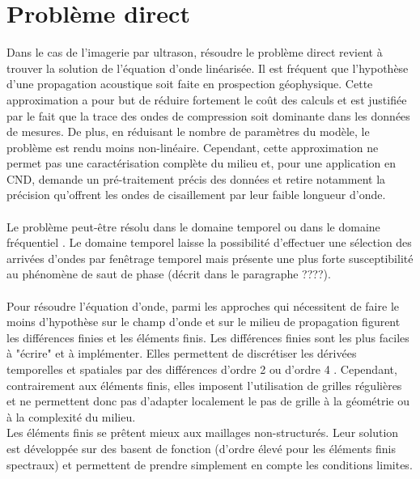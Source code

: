 

\section{Problème direct \label{pd_dir}}

Dans le cas de l'imagerie par ultrason, résoudre le problème direct revient à trouver la solution de l'équation d'onde linéarisée. Il est fréquent que l'hypothèse d'une propagation acoustique soit faite en prospection géophysique. Cette approximation a pour but de réduire fortement le coût des calculs et est justifiée par le fait que la trace des ondes de compression soit dominante dans les données de mesures. De plus, en réduisant le nombre de paramètres du modèle, le problème est rendu moins non-linéaire. Cependant, cette approximation ne permet pas une caractérisation complète du milieu et, pour une application en CND, demande un pré-traitement précis des données et retire notamment la précision qu'offrent les ondes de cisaillement par leur faible longueur d'onde.\\~\\
Le problème peut-être résolu dans le domaine temporel ou dans le domaine fréquentiel \citep{vigh_2008}. Le domaine temporel laisse la possibilité d'effectuer une sélection des arrivées d'ondes par fenêtrage temporel mais présente une plus forte susceptibilité au phénomène de saut de phase (décrit dans le paragraphe ????). \\~\\


 Pour résoudre l'équation d'onde, parmi les approches qui nécessitent de faire le moins d'hypothèse sur le champ d'onde et sur le milieu de propagation figurent les différences finies et les éléments finis. Les différences finies sont les plus faciles à "écrire" et à implémenter. Elles permettent de discrétiser les dérivées temporelles et spatiales par des différences d'ordre 2 \citep{virieux_86} ou d'ordre 4 \citep{levander}. Cependant, contrairement aux éléments finis, elles imposent l'utilisation de grilles régulières et ne permettent donc pas d'adapter localement le pas de grille à la géométrie ou à la complexité du milieu. \\ Les éléments finis se prêtent mieux aux maillages non-structurés. Leur solution est développée sur des basent de fonction (d'ordre élevé pour les éléments finis spectraux) et permettent de prendre simplement en compte les conditions limites.\\
 
